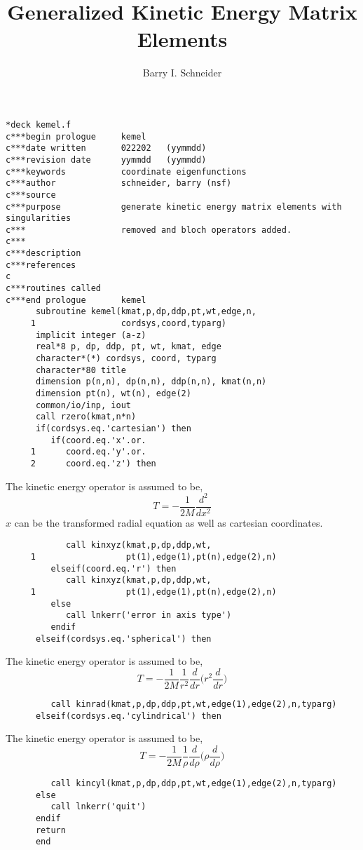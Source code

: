 \documentclass{article}
\title{Generalized Kinetic Energy Matrix Elements}
\author{Barry I. Schneider}
\date{}
\begin{document}
 \maketitle    
\begin{verbatim}
*deck kemel.f
c***begin prologue     kemel
c***date written       022202   (yymmdd)
c***revision date      yymmdd   (yymmdd)
c***keywords           coordinate eigenfunctions
c***author             schneider, barry (nsf)
c***source
c***purpose            generate kinetic energy matrix elements with singularities
c***                   removed and bloch operators added.
c***           
c***description
c***references         
c
c***routines called    
c***end prologue       kemel
      subroutine kemel(kmat,p,dp,ddp,pt,wt,edge,n,
     1                 cordsys,coord,typarg)
      implicit integer (a-z)
      real*8 p, dp, ddp, pt, wt, kmat, edge
      character*(*) cordsys, coord, typarg
      character*80 title
      dimension p(n,n), dp(n,n), ddp(n,n), kmat(n,n)
      dimension pt(n), wt(n), edge(2)
      common/io/inp, iout 
      call rzero(kmat,n*n)
      if(cordsys.eq.'cartesian') then
         if(coord.eq.'x'.or.
     1      coord.eq.'y'.or.
     2      coord.eq.'z') then
\end{verbatim}
 The kinetic energy operator is assumed to be,
 \begin{equation}
         T = - \frac{1}{2M} \frac{d^2}{dx^2}
 \end{equation}
 $x$ can be the transformed radial equation as well as cartesian coordinates.
\begin{verbatim}
            call kinxyz(kmat,p,dp,ddp,wt,
     1                  pt(1),edge(1),pt(n),edge(2),n)
         elseif(coord.eq.'r') then
            call kinxyz(kmat,p,dp,ddp,wt,
     1                  pt(1),edge(1),pt(n),edge(2),n)
         else
            call lnkerr('error in axis type')
         endif
      elseif(cordsys.eq.'spherical') then
\end{verbatim}
 The kinetic energy operator is assumed to be,
 \begin{equation}
    T =- \frac{1}{2M} \frac{1}{r^2} \frac{d}{dr} \big (  r^2 \frac{d} {dr} \big )
 \end{equation}
\begin{verbatim}
         call kinrad(kmat,p,dp,ddp,pt,wt,edge(1),edge(2),n,typarg)
      elseif(cordsys.eq.'cylindrical') then
\end{verbatim}
 The kinetic energy operator is assumed to be,
 \begin{equation}
    T =- \frac{1}{2M} \frac{1}{\rho} \frac{d}{d \rho} \big (  \rho \frac{d} {d \rho} \big )
 \end{equation}
\begin{verbatim}
         call kincyl(kmat,p,dp,ddp,pt,wt,edge(1),edge(2),n,typarg)
      else
         call lnkerr('quit')
      endif
      return
      end       
\end{verbatim}
\end{document}
